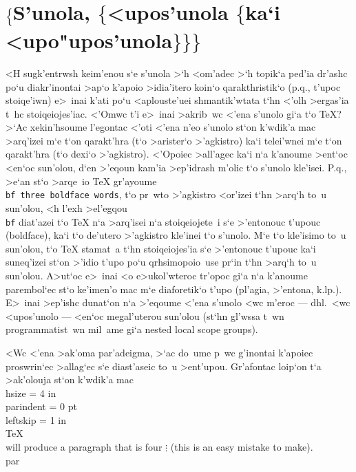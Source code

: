 \section{$\Bigl\{$S'unola, $\bigl\{$<upos'unola
        $\{$ka`i <upo"upos'unola$\}\bigr\}\Bigr\}$}

<H sugk'entrwsh keim'enou s`e {\tengs s'unola\/} >`h
{\tengs <om'adec\/} >`h {\tengs topik`a ped'ia dr'ashc\/} po`u
diakr'inontai >ap`o k'apoio >idia'itero koin`o qarakthristik`o (p.q.,
t'upoc stoiqe'iwn) e>~inai k'ati po`u <aplouste'uei shmanti\-k'wtata
t`hn <'olh >ergas'ia t~hc stoiqeiojes'iac.  <'Omwc t'i e>~inai >akrib~wc
<'ena s'unolo gi`a t`o {\rm \TeX}?  >`Ac xekin'hsoume l'egontac
<'oti <'ena n'eo s'unolo st`on k'wdik'a mac >arq'izei m`e t`on
qarakt'hra {\tt\lb} (t`o >arister`o >'agkistro) ka`i telei'wnei m`e t`on
qarakt'hra {\tt\rb} (t`o dexi`o >'agkistro).  <'Opoiec >all'agec
ka`i n`a k'anoume >ent`oc <en`oc sun'olou, d`en >'eqoun ka\-m'ia >ep'idrash
m'olic t`o s'unolo kle'isei. P.q., >e`an st`o >arqe~io {\rm \TeX}
gr'ayoume {\tt \lb \\bf three boldface words\rb}, t`o pr~wto >'agkistro
<or'izei t`hn >arq`h to~u sun'olou, <h l'exh >el'egqou {\tt\\bf}
diat'azei t`o {\rm \TeX} n`a >arq'isei n`a stoiqeiojete~i s`e >'entonouc
t'upouc ({\rm boldface}), ka`i t`o de'utero >'agkistro kle'inei t`o
s'unolo.  M`e t`o kle'isimo to~u sun'olou, t`o {\rm \TeX} stamat~a t`hn
stoiqeiojes'ia s`e >'entonouc t'upouc ka`i suneq'izei st`on >'idio t'upo
po`u qrhsimopoio~use pr`in t`hn >arq`h to~u sun'olou.  A>ut`oc e>~inai
<o e>ukol'wteroc tr'opoc gi`a n`a k'anoume parembol`ec st`o ke'imen'o
mac m`e diaforetik`o t'upo (pl'agia, >'entona, k.lp.)\null.  E>~inai
>ep'ishc dunat`on n`a >'eqoume <'ena s'unolo <wc m'eroc --- dhl.\ <wc
<upos'unolo --- <en`oc megal'uterou sun'olou (st`hn gl'wssa t~wn
pro\-gram\-mati\-st~wn mil~ame gi`a {\rm nested local scope groups}).

\def\sectiontitle{$\Bigl\{$S'unola, $\bigl\{$<upos'unola 
$\dots \bigr\}\Bigr\}$}

<Wc <'ena >ak'oma par'adeigma, >`ac do~ume p~wc g'inontai k'apoiec
proswrin`ec >allag`ec s`e diast'aseic to~u >ent'upou.  Gr'a\-fo\-ntac
loip`on t`a >ak'olouja st`on k'wdik'a mac
\beginuser
\lb
\\hsize = 4 in
\\parindent = 0 pt
\\leftskip = 1 in
\\TeX\\ will produce a paragraph that is four
$\vdots$
(this is an easy mistake to make).
\\par
\rb
\enduser

